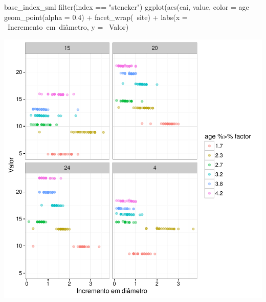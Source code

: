 \documentclass[article]{jss}
\begin{document}
\begin{CodeChunk}
\begin{CodeInput}
base_index_sml %
  filter(index == "steneker") %
  ggplot(aes(cai, value, color = age %
    geom_point(alpha = 0.4) +
    facet_wrap(~site) +
    labs(x = ~Incremento~em~diâmetro, y = ~Valor)
\end{CodeInput}


\begin{center}\includegraphics{comp3-paper_files/figure-latex/disp_steneker-1} \end{center}

\end{CodeChunk}
\end{document}

